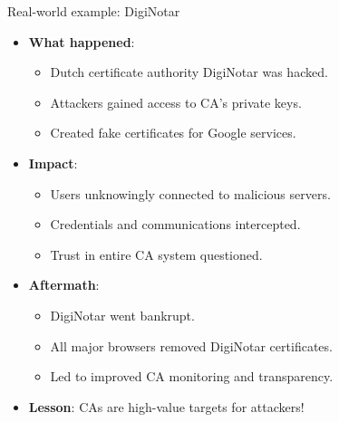 \documentclass[aspectratio=169, lualatex, handout]{beamer}
\begin{document}
\begin{frame}{Real-world example: DigiNotar}
	\begin{itemize}[<+->]
		\item \textbf{What happened}:
		      \begin{itemize}
			      \item Dutch certificate authority DigiNotar was hacked.
			      \item Attackers gained access to CA's private keys.
			      \item Created fake certificates for Google services.
		      \end{itemize}
		\item \textbf{Impact}:
		      \begin{itemize}
			      \item Users unknowingly connected to malicious servers.
			      \item Credentials and communications intercepted.
			      \item Trust in entire CA system questioned.
		      \end{itemize}
		\item \textbf{Aftermath}:
		      \begin{itemize}
			      \item DigiNotar went bankrupt.
			      \item All major browsers removed DigiNotar certificates.
			      \item Led to improved CA monitoring and transparency.
		      \end{itemize}
		\item \textbf{Lesson}: CAs are high-value targets for attackers!
	\end{itemize}
\end{frame}
\end{document}

